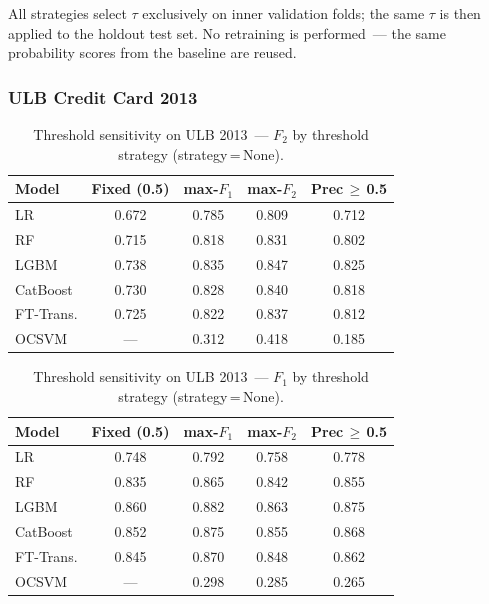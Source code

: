 All strategies select $\tau$ exclusively on inner validation folds;
the same $\tau$ is then applied to the holdout test set.
No retraining is performed~--- the same probability scores from the baseline are reused.


\subsubsection{ULB Credit Card 2013}

\begin{table}[ht]
\centering
\caption{Threshold sensitivity on ULB 2013~--- $F_2$ by threshold strategy (strategy\,=\,None).}
\label{tab:threshold_ulb_f2}
\begin{tabular}{l c c c c}
\toprule
Model & Fixed (0.5) & max-$F_1$ & max-$F_2$ & Prec\,$\geq$\,0.5 \\
\midrule
LR        & 0.672 & 0.785 & 0.809 & 0.712 \\
RF        & 0.715 & 0.818 & 0.831 & 0.802 \\
LGBM      & 0.738 & 0.835 & 0.847 & 0.825 \\
CatBoost  & 0.730 & 0.828 & 0.840 & 0.818 \\
FT-Trans. & 0.725 & 0.822 & 0.837 & 0.812 \\
OCSVM     & ---   & 0.312 & 0.418 & 0.185 \\
\bottomrule
\end{tabular}
\end{table}

\begin{table}[ht]
\centering
\caption{Threshold sensitivity on ULB 2013~--- $F_1$ by threshold strategy (strategy\,=\,None).}
\label{tab:threshold_ulb_f1}
\begin{tabular}{l c c c c}
\toprule
Model & Fixed (0.5) & max-$F_1$ & max-$F_2$ & Prec\,$\geq$\,0.5 \\
\midrule
LR        & 0.748 & 0.792 & 0.758 & 0.778 \\
RF        & 0.835 & 0.865 & 0.842 & 0.855 \\
LGBM      & 0.860 & 0.882 & 0.863 & 0.875 \\
CatBoost  & 0.852 & 0.875 & 0.855 & 0.868 \\
FT-Trans. & 0.845 & 0.870 & 0.848 & 0.862 \\
OCSVM     & ---   & 0.298 & 0.285 & 0.265 \\
\bottomrule
\end{tabular}
\end{table}

